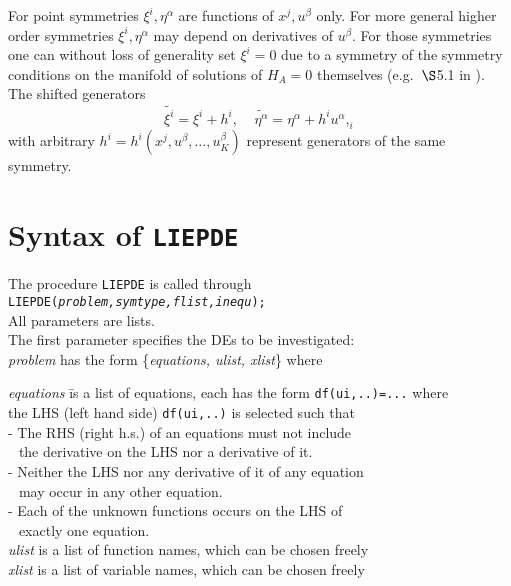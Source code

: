 \documentclass[12pt]{article}
\begin{document}
For point symmetries $\xi^i, \eta^\alpha$ are functions of $x^j,
u^\beta$ only. For more general higher order symmetries $\xi^i, \eta^\alpha$
may depend on derivatives of $u^\beta$. For those symmetries one can
without loss of generality set $\xi^i=0$ due to a symmetry of the symmetry
conditions on the manifold of solutions of $H_A=0$
themselves (e.g.\ $\S$5.1 in \cite{Olv}). The shifted generators
\[\tilde{\xi^i} = \xi^i + h^i, \; \; \; \; 
  \tilde{\eta^{\alpha}} = \eta^{\alpha} + h^i u^{\alpha},_i\]
with arbitrary $h^i=h^i(x^j, u^{\beta},\ldots, u^{\beta}_K)$
represent generators of the same symmetry. 

\section{Syntax of {\tt LIEPDE}}
The procedure {\tt LIEPDE} is called through \\
{\tt LIEPDE({\it problem,symtype,flist,inequ}); } \\
All parameters are lists. \vspace{6pt} \\
The first parameter specifies the DEs to be investigated: \\
{\it problem} has the form \{{\it equations, ulist, xlist}\} where
\begin{tabbing}
\hspace{0.5cm}
 {\it equations } \=  is a list of equations,
              each has the form {\tt df(ui,..)=...} where \\
       \> the LHS (left hand side) {\tt df(ui,..)} is selected such that \\
       \>  - The RHS (right h.s.) of an equations must not include     \\
       \>$\;\,$ the derivative on the LHS nor a derivative of it.  \\
       \>  - Neither the LHS nor any derivative of it of any equation \\
       \>$\;\,$ may occur in any other equation.\\
       \>  - Each of the unknown functions occurs on the LHS of \\
       \>$\;\,$ exactly one equation.  \\
\hspace{0.5cm}
 {\it ulist} \>  is a list of function names, which can be chosen freely \\
\hspace{0.5cm}
 {\it xlist}  \>  is a list of variable names, which can be chosen freely 
\end{tabbing}
\end{document}
